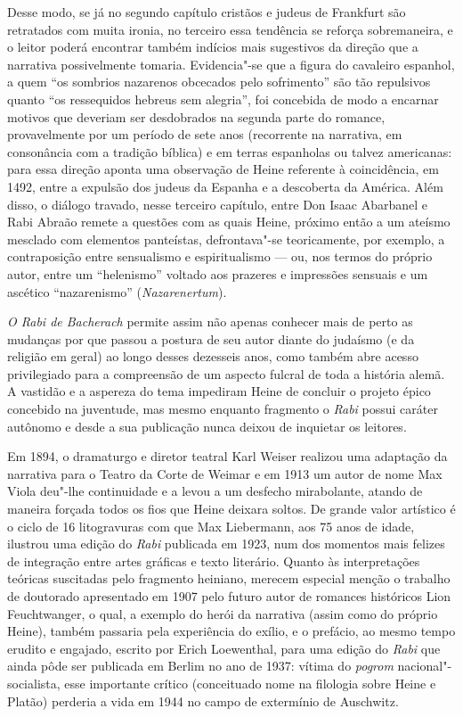 Desse modo, se já no segundo capítulo cristãos e judeus de Frankfurt são
retratados com muita ironia, no terceiro essa tendência se reforça
sobremaneira, e o leitor poderá encontrar também indícios mais
sugestivos da direção que a narrativa possivelmente tomaria.
Evidencia"-se que a figura do cavaleiro espanhol, a quem “os sombrios
nazarenos obcecados pelo sofrimento” são tão repulsivos quanto “os
ressequidos hebreus sem alegria”, foi concebida de modo a encarnar
motivos que deveriam ser desdobrados na segunda parte do romance,
provavelmente por um período de sete anos (recorrente na narrativa, em
consonância com a tradição bíblica) e em terras espanholas ou talvez
americanas: para essa direção aponta uma observação de Heine referente
à coincidência, em 1492, entre a expulsão dos judeus da Espanha e a
descoberta da América. Além disso, o diálogo travado, nesse terceiro
capítulo, entre Don Isaac Abarbanel e Rabi Abraão remete a questões com
as quais Heine, próximo então a um ateísmo mesclado com elementos
panteístas, defrontava"-se teoricamente, por exemplo, a contraposição
entre sensualismo e espiritualismo --- ou, nos termos do próprio autor,
entre um “helenismo” voltado aos prazeres e impressões sensuais e um
ascético “nazarenismo” (\textit{Nazarenertum}).

\textit{O Rabi de Bacherach} permite assim não apenas conhecer mais de
perto as mudanças por que passou a postura de seu autor diante do
judaísmo (e da religião em geral) ao longo desses dezesseis anos, como
também abre acesso privilegiado para a compreensão de um aspecto
fulcral de toda a história alemã. A vastidão e a aspereza do tema
impediram Heine de concluir o projeto épico concebido na juventude, mas
mesmo enquanto fragmento o \textit{Rabi} possui caráter autônomo e
desde a sua publicação nunca deixou de inquietar os leitores.



Em 1894, o dramaturgo e diretor teatral Karl Weiser realizou uma
adaptação da narrativa para o Teatro da Corte de Weimar e em 1913 um
autor de nome Max Viola deu"-lhe continuidade e a levou a um desfecho
mirabolante, atando de maneira forçada todos os fios que Heine deixara
soltos. De grande valor artístico é o ciclo de 16 litogravuras com que
Max Liebermann, aos 75 anos de idade, ilustrou uma edição do
\textit{Rabi} publicada em 1923, num dos momentos mais felizes de
integração entre artes gráficas e texto literário. Quanto às
interpretações teóricas suscitadas pelo fragmento heiniano, merecem
especial menção o trabalho de doutorado apresentado em 1907 pelo futuro
autor de romances históricos Lion Feuchtwanger, o qual, a exemplo do
herói da narrativa (assim como do próprio Heine), também passaria pela
experiência do exílio, e o prefácio, ao mesmo tempo erudito e engajado,
escrito por Erich Loewenthal, para uma edição do \textit{Rabi} que
ainda pôde ser publicada em Berlim no ano de 1937: vítima do
\textit{pogrom} nacional"-socialista, esse importante crítico
(conceituado nome na filologia sobre Heine e Platão) perderia a vida em
1944 no campo de extermínio de Auschwitz.

